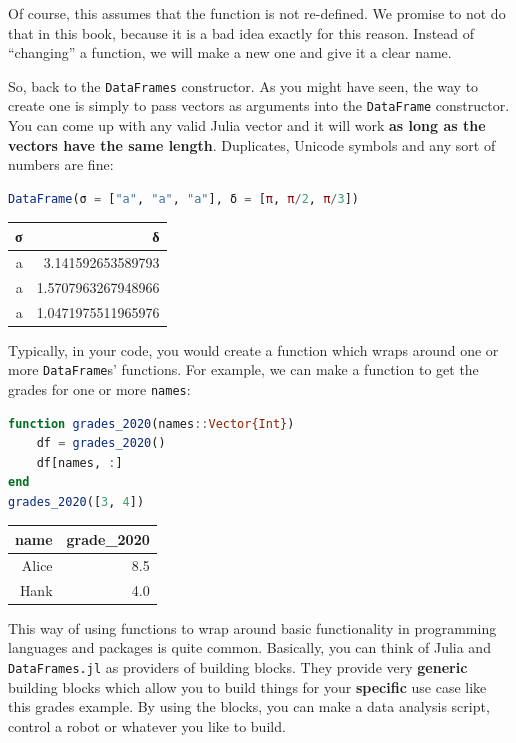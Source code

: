 \documentclass[
  notoc %
]{tufte-book}
\newcommand{\passthrough}[1]{#1}
\begin{document}
Of course, this assumes that the function is not re-defined. We promise
to not do that in this book, because it is a bad idea exactly for this
reason. Instead of ``changing'' a function, we will make a new one and
give it a clear name.

So, back to the \passthrough{\lstinline!DataFrames!} constructor. As you
might have seen, the way to create one is simply to pass vectors as
arguments into the \passthrough{\lstinline!DataFrame!} constructor. You
can come up with any valid Julia vector and it will work \textbf{as long
as the vectors have the same length}. Duplicates, Unicode symbols and
any sort of numbers are fine:

\begin{lstlisting}[language=Julia]
DataFrame(σ = ["a", "a", "a"], δ = [π, π/2, π/3])
\end{lstlisting}

\begin{longtable}[]{@{}rr@{}}
\toprule
σ & δ \\
\midrule
\endhead
a & 3.141592653589793 \\
a & 1.5707963267948966 \\
a & 1.0471975511965976 \\
\bottomrule
\end{longtable}

Typically, in your code, you would create a function which wraps around
one or more \passthrough{\lstinline!DataFrame!}s' functions. For
example, we can make a function to get the grades for one or more
\passthrough{\lstinline!names!}:

\begin{lstlisting}[language=Julia]
function grades_2020(names::Vector{Int})
    df = grades_2020()
    df[names, :]
end
grades_2020([3, 4])
\end{lstlisting}

\begin{longtable}[]{@{}rr@{}}
\toprule
name & grade\_2020 \\
\midrule
\endhead
Alice & 8.5 \\
Hank & 4.0 \\
\bottomrule
\end{longtable}

This way of using functions to wrap around basic functionality in
programming languages and packages is quite common. Basically, you can
think of Julia and \passthrough{\lstinline!DataFrames.jl!} as providers
of building blocks. They provide very \textbf{generic} building blocks
which allow you to build things for your \textbf{specific} use case like
this grades example. By using the blocks, you can make a data analysis
script, control a robot or whatever you like to build.
\end{document}
